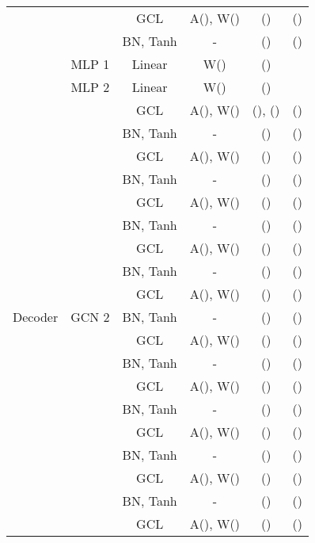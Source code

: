 \documentclass[sigconf,screen,nonacm]{acmart}
\begin{document}
\begin{table}[!t]
{\begin{tabular}{c|c|c|c|c|c}
				&                         & GCL      & A(), W()   & ()      & ()    \\ \cline{3-6}
				&                         & BN, Tanh & -                    & ()      & ()    \\ \cline{2-6} 
				& MLP 1                   & Linear & W()             & ()       &          \\ \cline{3-6} \cline{2-6} 
				& MLP 2                   & Linear & W()             & ()       &          \\ \hline
				\multirow{19}{*}{Decoder} & \multirow{19}{*}{GCN 2} & GCL      & A(), W() & (), () & ()    \\ \cline{3-6}
				&                         & BN, Tanh &  -                     & ()      & ()    \\ \cline{3-6}
				&                         & GCL      & A(), W()   & ()      & ()    \\ \cline{3-6}
				&                         & BN, Tanh &  -                    & ()      & ()    \\ \cline{3-6}
				&                         & GCL      & A(), W()   & ()      & ()    \\ \cline{3-6}
				&                         & BN, Tanh &  -                     & ()      & ()    \\ \cline{3-6}
				&                         & GCL      & A(), W()   & ()      & ()    \\ \cline{3-6}
				&                         & BN, Tanh &  -                    & ()      & ()    \\ \cline{3-6}
				&                         & GCL      & A(), W()   & ()      & ()    \\ \cline{3-6}
				&                         & BN, Tanh &  -                     & ()      & ()    \\ \cline{3-6}
				&                         & GCL      & A(), W()   & ()      & ()    \\ \cline{3-6}
				&                         & BN, Tanh & -                       & ()      & ()    \\ \cline{3-6}
				&                         & GCL      & A(), W()   & ()      & ()    \\ \cline{3-6}
				&                         & BN, Tanh &   -                     & ()      & ()    \\ \cline{3-6}
				&                         & GCL      & A(), W()   & ()      & ()    \\ \cline{3-6}
				&                         & BN, Tanh &   -                     & ()      & ()    \\ \cline{3-6}
				&                         & GCL      & A(), W()   & ()      & ()    \\ \cline{3-6}
				&                         & BN, Tanh &  -                   & ()      & ()    \\ \cline{3-6}
				&                         & GCL      & A(), W()    & ()      & ()     \\ 
				\bottomrule
		\end{tabular}}
	\end{table}
	
\end{document}
